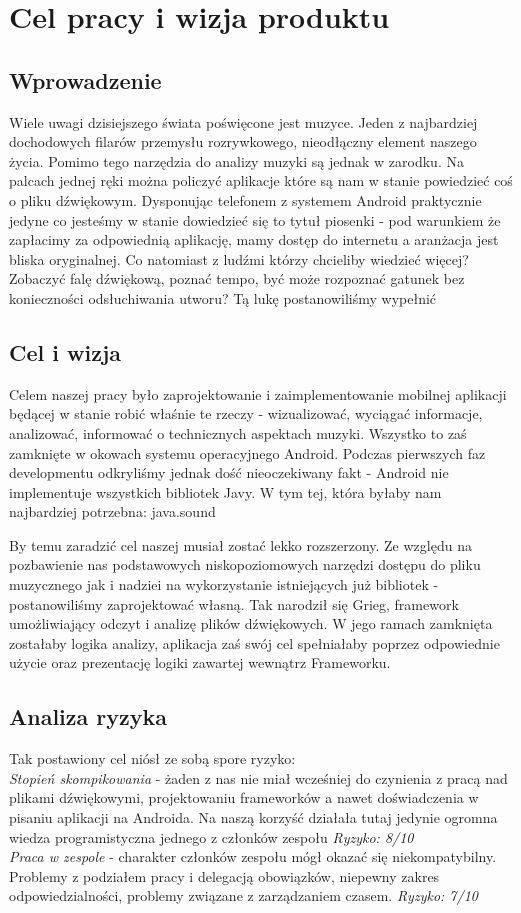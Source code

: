 \chapter{Cel pracy i wizja produktu}

\section{Wprowadzenie}
Wiele uwagi dzisiejszego świata poświęcone jest muzyce. Jeden z najbardziej dochodowych filarów przemysłu rozrywkowego, nieodłączny element naszego życia. Pomimo tego narzędzia do analizy muzyki są jednak w zarodku. Na palcach jednej ręki można policzyć aplikacje które są nam w stanie powiedzieć coś o pliku dźwiękowym. Dysponując telefonem z systemem Android praktycznie jedyne co jesteśmy w stanie dowiedzieć się to tytuł piosenki - pod warunkiem że zapłacimy za odpowiednią aplikację, mamy dostęp do internetu a aranżacja jest bliska oryginalnej. Co natomiast z ludźmi którzy chcieliby wiedzieć więcej? Zobaczyć falę dźwiękową, poznać tempo, być może rozpoznać gatunek bez konieczności odsłuchiwania utworu? Tą lukę postanowiliśmy wypełnić
\section{Cel i wizja}
Celem naszej pracy było zaprojektowanie i zaimplementowanie mobilnej aplikacji będącej w stanie robić właśnie te rzeczy - wizualizować, wyciągać informacje, analizować, informować o technicznych aspektach muzyki. Wszystko to zaś zamknięte w okowach systemu operacyjnego Android. Podczas pierwszych faz developmentu odkryliśmy jednak dość nieoczekiwany fakt - Android nie implementuje wszystkich bibliotek Javy. W tym tej, która byłaby nam najbardziej potrzebna: java.sound

By temu zaradzić cel naszej musiał zostać lekko rozszerzony. Ze względu na pozbawienie nas podstawowych niskopoziomowych narzędzi dostępu do pliku muzycznego jak i nadziei na wykorzystanie istniejących już bibliotek - postanowiliśmy zaprojektować własną. Tak narodził się Grieg, framework umożliwiający odczyt i analizę plików dźwiękowych. W jego ramach zamknięta zostałaby logika analizy, aplikacja zaś swój cel spełniałaby poprzez odpowiednie użycie oraz prezentację logiki zawartej wewnątrz Frameworku.

\section{Analiza ryzyka}
Tak postawiony cel niósł ze sobą spore ryzyko:
\\
\emph{Stopień skompikowania} - żaden z nas nie miał wcześniej do czynienia z pracą nad plikami dźwiękowymi, projektowaniu frameworków a nawet doświadczenia w pisaniu aplikacji na Androida. Na naszą korzyść działała tutaj jedynie ogromna wiedza programistyczna jednego z członków zespołu \emph{Ryzyko: 8/10}
\\
\emph{Praca w zespole} - charakter członków zespołu mógł okazać się niekompatybilny. Problemy z podziałem pracy i delegacją obowiązków, niepewny zakres odpowiedzialności, problemy związane z zarządzaniem czasem. \emph{Ryzyko: 7/10} 
 

